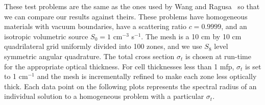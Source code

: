 \documentclass[12pt,letterpaper]{article}
\begin{document}
These test problems are the same as the ones used by Wang and Ragusa~\cite{WangRagusaDSA} so that we can compare our results against theirs. These problems have homogeneous materials with vacuum boundaries, have a scattering ratio $c=0.9999$, and an isotropic volumetric source $S_0 = 1$ cm$^{-3}$ s$^{-1}$. The mesh is a 10 cm by 10 cm quadrilateral grid uniformly divided into 100 zones, and we use $S_8$ level symmetric angular quadrature. The total cross section $\sigma_t$ is chosen at run-time for the appropriate optical thickness. For cell thicknesses less than 1 mfp, $\sigma_t$ is set to 1 cm$^{-1}$ and the mesh is incrementally refined to make each zone less optically thick. Each data point on the following plots represents the spectral radius of an individual solution to a homogeneous problem with a particular $\sigma_t$.
\end{document}
